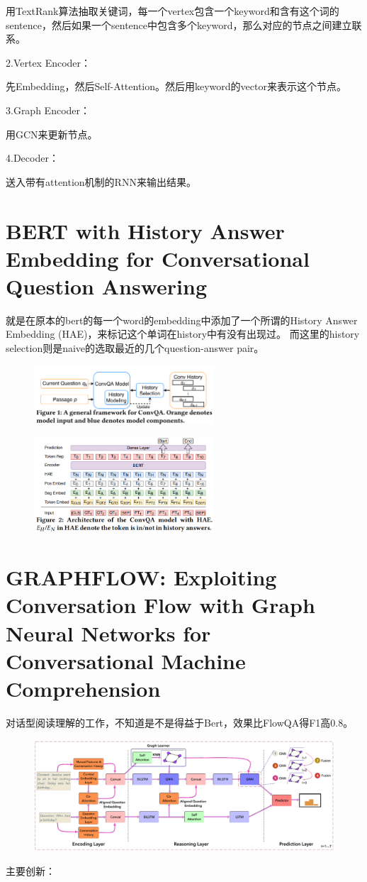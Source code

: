 \documentclass[a4paper,UTF8]{article}
\numberwithin{equation}{section}
\begin{document}
用TextRank算法抽取关键词，每一个vertex包含一个keyword和含有这个词的sentence，然后如果一个sentence中包含多个keyword，那么对应的节点之间建立联系。

2.Vertex Encoder：

先Embedding，然后Self-Attention。然后用keyword的vector来表示这个节点。

3.Graph Encoder：

用GCN来更新节点。

4.Decoder：

送入带有attention机制的RNN来输出结果。

\newpage
\section{BERT with History Answer Embedding for Conversational Question Answering}
就是在原本的bert的每一个word的embedding中添加了一个所谓的History Answer Embedding (HAE)，来标记这个单词在history中有没有出现过。
而这里的history selection则是naive的选取最近的几个question-answer pair。
\begin{figure}[H]
	\centering
	\includegraphics[width=0.6\textwidth]{10-1.png}
\end{figure}
\begin{figure}[H]
	\centering
	\includegraphics[width=0.6\textwidth]{10-2.png}
\end{figure}

\newpage
\section{GRAPHFLOW: Exploiting Conversation Flow with Graph Neural Networks for Conversational Machine Comprehension}
对话型阅读理解的工作，不知道是不是得益于Bert，效果比FlowQA得F1高0.8。
\begin{figure}[H]
	\centering
	\includegraphics[width=\textwidth]{11-1.png}
\end{figure}
主要创新：
\end{document}
